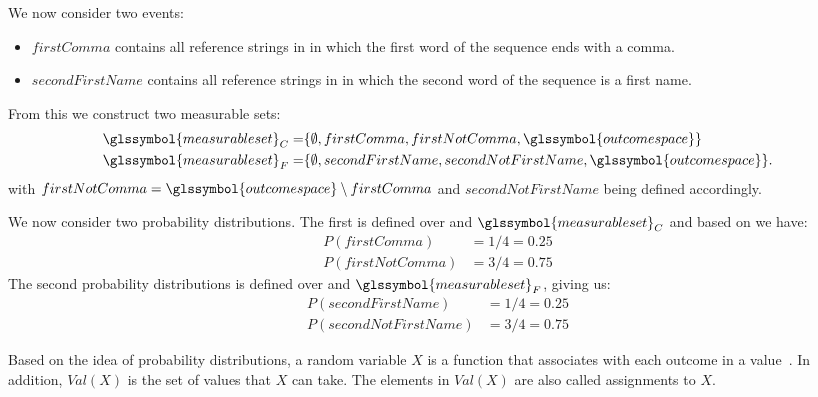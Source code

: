 We now consider two events:
\begin{itemize}
  \item $firstComma$ contains all reference strings in  in which the first word of the sequence ends with a comma.
  \item $secondFirstName$ contains all reference strings in  in which the second word of the sequence is a first name.
\end{itemize}

From this we construct two \glspl{measurable set}:
\begin{equation*}
  \label{equ:eg-measurable-sets}
    \begin{split}
  \glssymbol{measurable set}_{C}=& \{\emptyset,firstComma, firstNotComma, \glssymbol{outcome space}\}\\
  \glssymbol{measurable set}_{F}=& \{\emptyset,secondFirstName, secondNotFirstName, \glssymbol{outcome space}\}.
    \end{split}
\end{equation*}
with $firstNotComma=\glssymbol{outcome space}\setminus firstComma$ and $secondNotFirstName$ being defined accordingly.

We now consider two \glspl{probability distribution}.
The first is defined over  and $\glssymbol{measurable set}_{C}$ and based on  we have:
\begin{equation*}
  \label{equ:eg-measurable-sets}
    \begin{split}
      P(firstComma)&=1/4=0.25\\
      P(firstNotComma)&=3/4=0.75
    \end{split}
\end{equation*}
The second \glspl{probability distribution} is defined over  and $\glssymbol{measurable set}_{F}$, giving us:
\begin{equation*}
  \label{equ:eg-measurable-sets}
    \begin{split}
      P(secondFirstName)&=1/4=0.25\\
      P(secondNotFirstName)&=3/4=0.75
    \end{split}
\end{equation*}

\bigskip

Based on the idea of \glspl{probability distribution}, a \gls{random variable} $X$ is a \gls{function} that associates with each outcome in  a value~\cite{koller2009probabilistic}.
In addition, $Val(X)$ is the set of values that $X$ can take.
The elements in $Val(X)$ are also called assignments to $X$.

